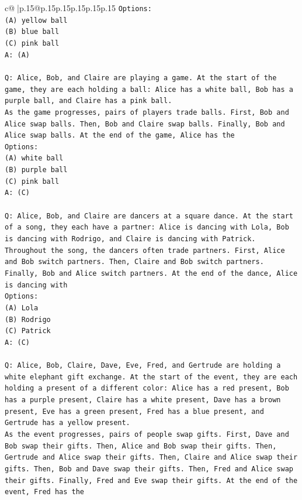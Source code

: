 \documentclass{article}
\begin{document}
{\begin{supertabular}{c@{$\;$}|p{.15\linewidth}@{}p{.15\linewidth}p{.15\linewidth}p{.15\linewidth}p{.15\linewidth}p{.15\linewidth}}
{{{\texttt{Options:} \\
\texttt{(A) yellow ball} \\
\texttt{(B) blue ball} \\
\texttt{(C) pink ball} \\
\texttt{A: (A)} \\
\\ 
\texttt{Q: Alice, Bob, and Claire are playing a game. At the start of the game, they are each holding a ball: Alice has a white ball, Bob has a purple ball, and Claire has a pink ball.} \\
\texttt{As the game progresses, pairs of players trade balls. First, Bob and Alice swap balls. Then, Bob and Claire swap balls. Finally, Bob and Alice swap balls. At the end of the game, Alice has the} \\
\texttt{Options:} \\
\texttt{(A) white ball} \\
\texttt{(B) purple ball} \\
\texttt{(C) pink ball} \\
\texttt{A: (C)} \\
\\ 
\texttt{Q: Alice, Bob, and Claire are dancers at a square dance. At the start of a song, they each have a partner: Alice is dancing with Lola, Bob is dancing with Rodrigo, and Claire is dancing with Patrick.} \\
\texttt{Throughout the song, the dancers often trade partners. First, Alice and Bob switch partners. Then, Claire and Bob switch partners. Finally, Bob and Alice switch partners. At the end of the dance, Alice is dancing with} \\
\texttt{Options:} \\
\texttt{(A) Lola} \\
\texttt{(B) Rodrigo} \\
\texttt{(C) Patrick} \\
\texttt{A: (C)} \\
\\ 
\texttt{Q: Alice, Bob, Claire, Dave, Eve, Fred, and Gertrude are holding a white elephant gift exchange. At the start of the event, they are each holding a present of a different color: Alice has a red present, Bob has a purple present, Claire has a white present, Dave has a brown present, Eve has a green present, Fred has a blue present, and Gertrude has a yellow present.} \\
\texttt{As the event progresses, pairs of people swap gifts. First, Dave and Bob swap their gifts. Then, Alice and Bob swap their gifts. Then, Gertrude and Alice swap their gifts. Then, Claire and Alice swap their gifts. Then, Bob and Dave swap their gifts. Then, Fred and Alice swap their gifts. Finally, Fred and Eve swap their gifts. At the end of the event, Fred has the} \\
}}}
\end{supertabular}}
\end{document}
